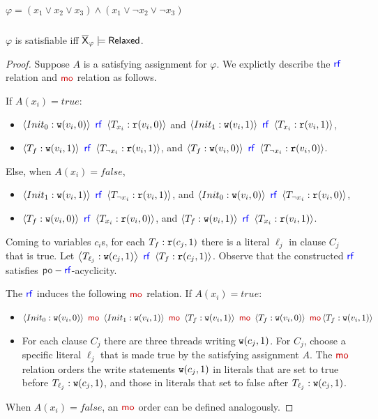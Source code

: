 \begin{table}[h]
\begin{minipage}{0.45\textwidth}
\begin{tabular}{c}
\end{tabular}
\end{minipage}
\vspace{2em}
\caption{$\varphi=(x_1\lor x_2\lor x_3)\land (x_1 \lor \neg x_2\lor \neg x_3)$}
    \label{tab:relaxed-example-finegrainedwra}
\end{table}

\begin{lemma}
    $\varphi$ is satisfiable iff $\overline{\mathsf{\color{black}X}}_\varphi  \models \mathsf{Relaxed}$.
\end{lemma}

\begin{proof}
    Suppose $A$ is a satisfying assignment for $\varphi$. We explictly describe the $\rf$ relation and $\mo$ relation as follows. 
    
    If $A(x_i) = true$:
    \begin{itemize}[leftmargin=0.1em]
    \item $\tuple{Init_0: \wt(v_i, 0)}~\rf~\tuple{T_{x_i}: \rd(v_i, 0)}$ and $\tuple{Init_1: \wt(v_i, 1)}~\rf~\tuple{T_{x_i}: \rd(v_i, 1)}$,
    \item $\tuple{T_f: \wt(v_i, 1)}~\rf~\tuple{T_{\neg x_i}: \rd(v_i, 1)}$, and $\tuple{T_f: \wt(v_i, 0)}~\rf~\tuple{T_{\neg x_i}: \rd(v_i, 0)}$. 
    \end{itemize} 
    Else, when $A(x_i) = false$, 
    \begin{itemize}[leftmargin=0.1em]
    \item $\tuple{Init_1: \wt(v_i, 1)}~\rf~\tuple{T_{\neg x_i}: \rd(v_i, 1)}$, and $\tuple{Init_0: \wt(v_i, 0)}~\rf~\tuple{T_{\neg x_i}: \rd(v_i, 0)}$,
    \item $\tuple{T_f: \wt(v_i, 0)}~\rf~\tuple{T_{ x_i}: \rd(v_i, 0)}$, and $\tuple{T_f: \wt(v_i, 1)}~\rf~\tuple{T_{ x_i}: \rd(v_i, 1)}$. 
    \end{itemize} 
            
    Coming to variables $c_i$s, for each $T_f: \mathtt{r}(c_j, 1)$ there is a literal $\ell_j$ in clause $C_j$ that is true. Let $\tuple{T_{\ell_j}: \wt(c_j, 1)}~\rf~ \tuple{T_f: \rd(c_j, 1)}$. Observe that the constructed $\rf$ satisfies $\po-\rf$-acyclicity.
    
    The $\rf$ induces the following $\mo$ relation. If $A(x_i) = true$: 
    \begin{itemize}[leftmargin=0.1em]
    \item $\tuple{Init_0: \wt(v_i, 0)} ~\mo~\tuple{Init_1: \wt(v_i, 1)} ~\mo~\tuple{T_f: \wt(v_i, 1)}~\mo~\tuple{T_f: \wt(v_i, 0)} ~\mo~\\ \tuple{T_f: \wt(v_i, 1)}$
    \item For each clause $C_j$ there are three threads writing $\mathtt{w}(c_j, 1)$.  For $C_j$, choose a specific literal $\ell_j$ that is made true by the satisfying assignment $A$. 
    The $\mo$ relation orders the write statements $\mathtt{w}(c_j, 1)$ in literals that are set to true before $T_{\ell_j}: \mathtt{w}(c_j, 1)$, and those in literals that set to false after $T_{\ell_j}: \mathtt{w}(c_j, 1)$.
    \end{itemize}  
    When $A(x_i) = false$, an $\mo$ order can be defined analogously. 
    

\end{proof}
